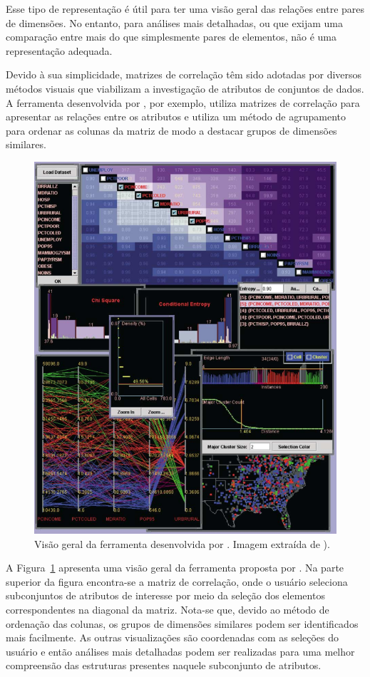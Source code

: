 Esse tipo de representação é útil para ter uma visão
geral das relações entre pares de dimensões. No entanto,
para análises mais detalhadas, ou que exijam uma comparação
entre mais do que simplesmente pares de elementos, não é uma
representação adequada.

Devido à sua simplicidade, matrizes de correlação têm sido
adotadas por diversos métodos visuais que viabilizam a
investigação de atributos de conjuntos de dados. A
ferramenta desenvolvida por \citet{Guo2003}, por exemplo,
utiliza matrizes de correlação para apresentar as relações
entre os atributos e utiliza um método de agrupamento para
ordenar as colunas da matriz de modo a destacar grupos de
dimensões similares.

\begin{figure}[h!]
    \centering
    \includegraphics[width=12cm]{images/coord.png}
    \caption[Ferramenta proposta por \cite{Guo2003}]
    {Visão geral da ferramenta desenvolvida por
    \citet{Guo2003}. Imagem extraída de \cite{Guo2003}).} 
    \label{fig:coord}
\end{figure}

A Figura~\ref{fig:coord} apresenta uma visão geral da
ferramenta proposta por \citet{Guo2003}. Na parte superior
da figura encontra-se a matriz de correlação, onde o usuário
seleciona subconjuntos de atributos de interesse por meio da
seleção dos elementos correspondentes na diagonal da matriz.
Nota-se que, devido ao método de ordenação das colunas,
os grupos de dimensões similares podem ser identificados
mais facilmente. As outras visualizações são coordenadas com
as seleções do usuário e então análises mais detalhadas podem
ser realizadas para uma melhor compreensão das estruturas
presentes naquele subconjunto de atributos. 

